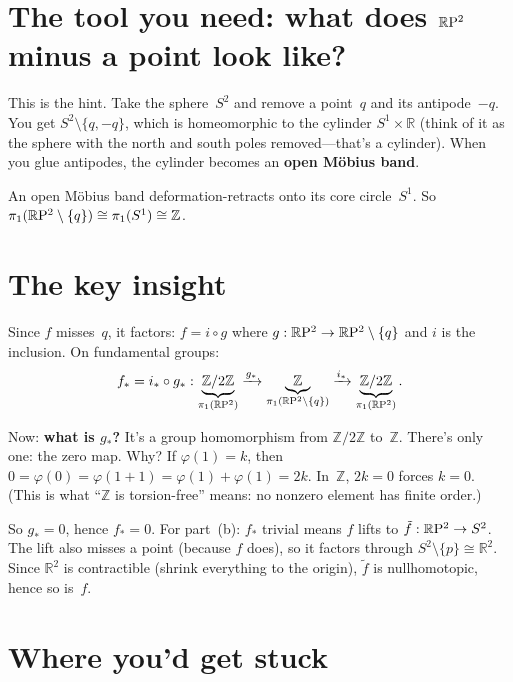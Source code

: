 \section{The tool you need: what does $\mathbb{R}\mathrm{P}^2$ minus a point look like?}

This is the hint. Take the sphere~$S^2$ and remove a point~$q$ and its
antipode~$-q$. You get $S^2 \setminus \{q, -q\}$, which is homeomorphic
to the cylinder $S^1 \times \mathbb{R}$ (think of it as the sphere with
the north and south poles removed---that's a cylinder). When you glue
antipodes, the cylinder becomes an \textbf{open M\"obius band}.

An open M\"obius band deformation-retracts onto its core circle~$S^1$.
So $\pi_1(\mathbb{R}\mathrm{P}^2 \setminus \{q\}) \cong \pi_1(S^1) \cong \mathbb{Z}$.

\section{The key insight}

Since $f$ misses~$q$, it factors: $f = i \circ g$ where
$g : \mathbb{R}\mathrm{P}^2 \to \mathbb{R}\mathrm{P}^2 \setminus \{q\}$ and $i$ is the inclusion. On
fundamental groups:
\[
  f_* = i_* \circ g_* :
  \underbrace{\mathbb{Z}/2\mathbb{Z}}_{\pi_1(\mathbb{R}\mathrm{P}^2)}
  \xrightarrow{g_*}
  \underbrace{\mathbb{Z}}_{\pi_1(\mathbb{R}\mathrm{P}^2 \setminus \{q\})}
  \xrightarrow{i_*}
  \underbrace{\mathbb{Z}/2\mathbb{Z}}_{\pi_1(\mathbb{R}\mathrm{P}^2)}.
\]

Now: \textbf{what is $g_*$?} It's a group homomorphism from
$\mathbb{Z}/2\mathbb{Z}$ to~$\mathbb{Z}$. There's only one: the zero
map. Why? If $\varphi(1) = k$, then $0 = \varphi(0) = \varphi(1 + 1) =
\varphi(1) + \varphi(1) = 2k$. In~$\mathbb{Z}$, $2k = 0$ forces $k = 0$.
(This is what ``$\mathbb{Z}$ is torsion-free'' means: no nonzero element
has finite order.)

So $g_* = 0$, hence $f_* = 0$. For part~(b): $f_*$ trivial means $f$
lifts to $\tilde{f} : \mathbb{R}\mathrm{P}^2 \to S^2$. The lift also misses a point
(because $f$ does), so it factors through $S^2 \setminus \{p\} \cong
\mathbb{R}^2$. Since $\mathbb{R}^2$ is contractible (shrink everything
to the origin), $\tilde{f}$ is nullhomotopic, hence so is~$f$.

\section{Where you'd get stuck}

